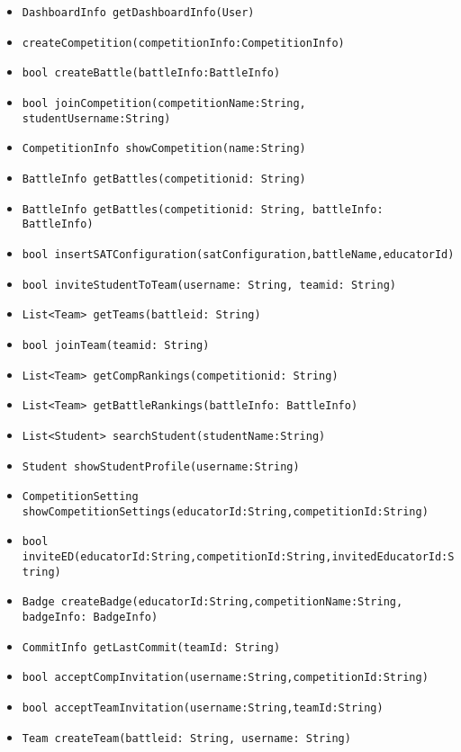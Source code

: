 \begin{itemize}
    \item \texttt{DashboardInfo getDashboardInfo(User)}
    \item \texttt{createCompetition(competitionInfo:CompetitionInfo)}
    \item \texttt{bool createBattle(battleInfo:BattleInfo)}
    \item \texttt{bool joinCompetition(competitionName:String, studentUsername:String)}
    \item \texttt{CompetitionInfo showCompetition(name:String)}
    \item \texttt{BattleInfo getBattles(competitionid: String)}
    \item \texttt{BattleInfo getBattles(competitionid: String, battleInfo: BattleInfo)}
    \item \texttt{bool insertSATConfiguration(satConfiguration,battleName,educatorId)}
    \item \texttt{bool inviteStudentToTeam(username: String, teamid: String)}
    \item \texttt{List<Team> getTeams(battleid: String)}
    \item \texttt{bool joinTeam(teamid: String)}
    \item \texttt{List<Team> getCompRankings(competitionid: String)}
    \item \texttt{List<Team> getBattleRankings(battleInfo: BattleInfo)}
    \item \texttt{List<Student> searchStudent(studentName:String)}
    \item \texttt{Student showStudentProfile(username:String)}
    \item \texttt{CompetitionSetting showCompetitionSettings(educatorId:String,competitionId:String)}
    \item \texttt{bool inviteED(educatorId:String,competitionId:String,invitedEducatorId:String)}
    \item \texttt{Badge createBadge(educatorId:String,competitionName:String, badgeInfo: BadgeInfo)}
    \item \texttt{CommitInfo getLastCommit(teamId: String)}
    \item \texttt{bool acceptCompInvitation(username:String,competitionId:String)}
    \item \texttt{bool acceptTeamInvitation(username:String,teamId:String)}
    \item \texttt{Team createTeam(battleid: String, username: String)}
\end{itemize}

